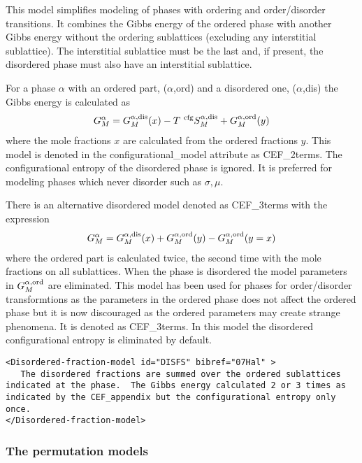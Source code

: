 \documentclass[12pt]{article}
\begin{document}
\begin{appendices}
This model simplifies modeling of phases with ordering and
order/disorder transitions.  It combines the Gibbs energy of the
ordered phase with another Gibbs energy without the ordering
sublattices (excluding any interstitial sublattice).  The interstitial
sublattice must be the last and, if present, the disordered phase must
also have an interstitial sublattice.

For a phase $\alpha$ with an ordered part, ($\alpha$,ord) and a
disordered one, ($\alpha$,dis) the Gibbs energy is calculated as
\begin{eqnarray}
G^{\alpha}_M = G^{\alpha,\rm dis}_M(x) -T~^{\rm cfg}S^{\alpha,\rm dis}_M + G^{\alpha,\rm ord}_M(y)
\end{eqnarray}
where the mole fractions $x$ are calculated from the ordered fractions
$y$.  This model is denoted in the configurational\_model attribute as
CEF\_2terms.  The configurational entropy of the disordered phase is
ignored.  It is preferred for modeling phases which never disorder
such as $\sigma, \mu$.

There is an alternative disordered model denoted as CEF\_3terms with
the expression
\begin{eqnarray}
G^{\alpha}_M = G^{\alpha,\rm dis}_M(x) + G^{\alpha,\rm ord}_M(y) - G^{\alpha,\rm ord}_M(y=x)
\end{eqnarray}
where the ordered part is calculated twice, the second time with the
mole fractions on all sublattices.  When the phase is disordered the
model parameters in $G^{\alpha,\rm ord}_M$ are eliminated.  This model
has been used for phases for order/disorder transformtions as the
parameters in the ordered phase does not affect the ordered phase but
it is now discouraged as the ordered parameters may create strange
phenomena.  It is denoted as CEF\_3terms.  In this model the disordered
configurational entropy is eliminated by default.

{\small
\begin{verbatim}
<Disordered-fraction-model id="DISFS" bibref="07Hal" >
   The disordered fractions are summed over the ordered sublattices indicated at the phase.  The Gibbs energy calculated 2 or 3 times as indicated by the CEF_appendix but the configurational entropy only once.
</Disordered-fraction-model>
\end{verbatim}
}

\subsubsection{The permutation models}


\end{appendices}
\end{document}
